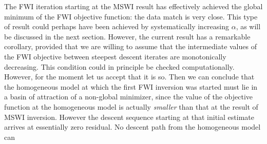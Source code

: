 The FWI iteration starting at the MSWI result has effectively achieved
the global minimum of the FWI objective function: the data match is
very close. This type of result could perhaps have been achieved by
systematically increasing $\alpha$, as will be discussed in the next
section. However, the current result has a remarkable corollary,
provided that we are willing to assume that the intermediate values of
the FWI objective between steepest descent iterates are monotonically
decreasing. This condition could in principle be checked
computationally. However, for the moment let us accept that it is
so. Then we can conclude that the homogeneous model at which the first
FWI inversion was started must lie in a basin of attraction of a
non-global minimizer, since the value of the objective function at the
homogeneous model is actually {\em smaller} than that at the result of
MSWI inversion. However the descent sequence starting at that initial
estimate arrives at essentially zero residual. No descent path from
the homogeneous model can  



